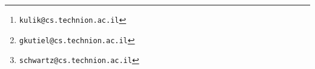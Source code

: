 \title{\titletext}

\date{}

\author[1]{Ariel Kulik	\thanks{\texttt{kulik@cs.technion.ac.il}}}
\author[1]{Gilad Kutiel	\thanks{\texttt{gkutiel@cs.technion.ac.il}}}
\author[1]{Roy Schwartz	\thanks{\texttt{schwartz@cs.technion.ac.il}}}

